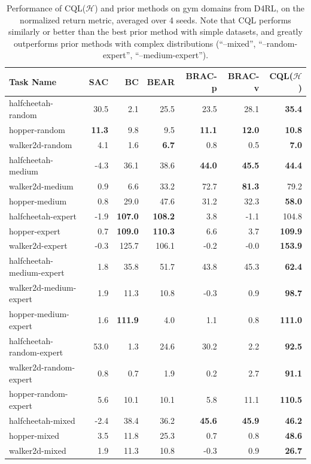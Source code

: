 \begin{table}[h]
\captionsetup{font=small}
\centering
\fontsize{8}{8}\selectfont

\begin{tabular}{l|r|r|r|r|r||r}
\hline
\textbf{Task Name} & \textbf{SAC} & \textbf{BC} & \textbf{BEAR} & \textbf{BRAC-p} & \textbf{BRAC-v} & \textbf{CQL($\mathcal{H}$)}\\ \hline
halfcheetah-random &  30.5 & 2.1 & 25.5 & 23.5 & 28.1 & \textbf{35.4} \\
hopper-random & \textbf{11.3} & 9.8 & 9.5 & \textbf{11.1} & \textbf{12.0} & \textbf{10.8}\\
walker2d-random & 4.1 & 1.6 & \textbf{6.7} & 0.8 & 0.5 & \textbf{7.0}\\ \hline
halfcheetah-medium & -4.3 & 36.1 & 38.6 & \textbf{44.0} & \textbf{45.5} & \textbf{44.4}\\
walker2d-medium & 0.9 & 6.6  & 33.2 & 72.7 & \textbf{81.3} & {79.2}\\
hopper-medium & 0.8 & 29.0 & 47.6 & 31.2 & 32.3 & \textbf{58.0}\\ \hline
halfcheetah-expert & -1.9 & \textbf{107.0} & \textbf{108.2} & 3.8 & -1.1 & {104.8}\\
hopper-expert & 0.7 & \textbf{109.0} & \textbf{110.3} & 6.6 & 3.7 & \textbf{109.9} \\
walker2d-expert & -0.3 & 125.7 & 106.1 & -0.2 & -0.0 & \textbf{153.9} \\ \hline
halfcheetah-medium-expert & 1.8 & 35.8 & 51.7 & 43.8 & 45.3 & \textbf{62.4}\\
walker2d-medium-expert & 1.9 & 11.3 & 10.8 & -0.3 & 0.9 & \textbf{98.7}\\
hopper-medium-expert & 1.6 & \textbf{111.9} & 4.0 & 1.1 & 0.8 & \textbf{111.0}\\ \hline
halfcheetah-random-expert & 53.0 & 1.3 & 24.6 & 30.2 & 2.2 & \textbf{92.5}\\
walker2d-random-expert & 0.8 & 0.7 & 1.9 & 0.2 & 2.7 & \textbf{91.1}\\
hopper-random-expert & 5.6 & 10.1 & 10.1 & 5.8 & 11.1 & \textbf{110.5} \\ \hline
halfcheetah-mixed & -2.4 & 38.4 & 36.2 & \textbf{45.6} & \textbf{45.9} & \textbf{46.2}\\
hopper-mixed & 3.5 & 11.8 & 25.3 & 0.7 & 0.8 & \textbf{48.6}\\
walker2d-mixed & 1.9 & 11.3 & 10.8 & -0.3 & 0.9 & \textbf{26.7}\\
\hline
\end{tabular}
\vspace{-4pt}
\caption{\label{table:mujoco}{\small Performance of CQL($\mathcal{H}$) and prior methods on gym domains from D4RL, on the normalized return metric, averaged over 4 seeds. Note that CQL performs similarly or better than the best prior method with simple datasets, and greatly outperforms prior methods with complex distributions (``--mixed'', ``--random-expert'', ``--medium-expert'').}}
\normalsize
\vspace{-10pt}
\end{table}


